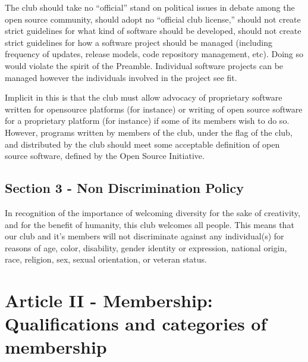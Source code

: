 \documentclass{article}
\begin{document}
	The club should take no ``official'' stand on political issues in debate
	among the open source community, should adopt no ``official club license,''
	should not create strict guidelines for what kind of software should be
	developed, should not create strict guidelines for how a software project
	should be managed (including frequency of updates, release models, code
	repository management, etc). Doing so would violate the spirit of the
	Preamble. Individual software projects can be managed however the
	individuals involved in the project see fit.

	Implicit in this is that the club must allow advocacy of proprietary
	software written for opensource platforms (for instance) or writing of open
	source software for a proprietary platform (for instance) if some of its
	members wish to do so. However, programs written by members of the club,
	under the flag of the club, and distributed by the club should meet some
	acceptable definition of open source software, defined by the Open Source
	Initiative.

	\subsection{Section 3 - Non Discrimination Policy}

	In recognition of the importance of welcoming diversity for the sake of
	creativity, and for the benefit of humanity, this club welcomes all people.
	This means that our club and it's members will not discriminate against any
	individual(s) for reasons of age, color, disability, gender identity or
	expression, national origin, race, religion, sex, sexual orientation, or
	veteran status.

	\section{Article II - Membership: Qualifications and categories of
	membership}


\end{document}
